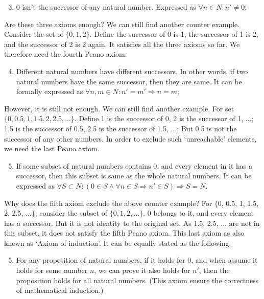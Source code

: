 \documentclass[UTF8]{article}
\begin{document}
\begin{enumerate}
  \setcounter{enumi}{2}
  \item 0 isn't the successor of any natural number. Expressed as $\forall n \in N: n' \neq 0$;
\end{enumerate}

Are these three axioms enough? We can still find another counter example. Consider the set of $\{0, 1, 2\}$. Define the successor of 0 is 1, the successor of 1 is 2, and the successor of 2 is 2 again. It satisfies all the three axioms so far. We therefore need the fourth Peano axiom.

\begin{enumerate}
  \setcounter{enumi}{3}
  \item Different natural numbers have different successors. In other words, if two natural numbers have the same successor, then they are same. It can be formally expressed as $\forall n, m \in N: n' = m' \Rightarrow n = m$;
\end{enumerate}

However, it is still not enough. We can still find another example. For set $\{0, 0.5, 1, 1.5, 2, 2.5, ...\}$. Define 1 is the successor of 0, 2 is the successor of 1, ...; 1.5 is the successor of 0.5, 2.5 is the successor of 1.5, ...; But 0.5 is not the successor of any other numbers. In order to exclude such `unreachable' elements, we need the last Peano axiom.

\begin{enumerate}
  \setcounter{enumi}{4}
  \item If some subset of natural numbers contains 0, and every element in it has a successor, then this subset is same as the whole natural numbers. It can be expressed as $\forall S \subset N: (0 \in S \land \forall n \in S \Rightarrow n' \in S) \Rightarrow S = N$.
\end{enumerate}

Why does the fifth axiom exclude the above counter example? For $\{$0, 0.5, 1, 1.5, 2, 2.5, ...$\}$, consider the subset of $\{0, 1, 2, ...\}$. 0 belongs to it, and every element has a successor. But it is not identity to the original set. As 1.5, 2.5, ... are not in this subset, it does not satisfy the fifth Peano axiom. This last axiom as also known as `Axiom of induction'. It can be equally stated as the following.

\begin{enumerate}
  \setcounter{enumi}{4}
  \item For any proposition of natural numbers, if it holds for 0, and when assume it holds for some number $n$, we can prove it also holds for $n'$, then the proposition holds for all natural numbers. (This axiom ensure the correctness of mathematical induction.)
\end{enumerate}
\end{document}
